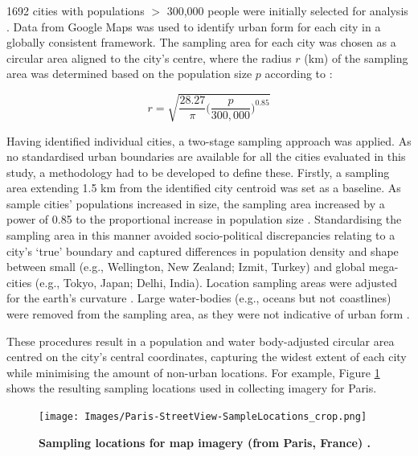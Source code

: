 \documentclass[final,3p,times,authoryear]{elsarticle}
\begin{document}
1692 cities with populations $>$ 300,000 people were initially selected for analysis \citep{UN2014}. Data from Google Maps was used to identify urban form for each city in a globally consistent framework. The sampling area for each city was chosen as a circular area aligned to the city's centre, where the radius $r$ (km) of the sampling area was determined based on the population size $p$ according to \citet{Barthelemy2016}: 

\begin{equation}
r = \sqrt{ \frac{28.27}{\pi} \bigg( \frac{p}{300,000}  \bigg)^{0.85} }
\end{equation}


Having identified individual cities, a two-stage sampling approach was applied. As no standardised urban boundaries are available for all the cities evaluated in this study, a methodology had to be developed to define these. Firstly, a sampling area extending 1.5 km from the identified city centroid \citep{UN2014} was set as a baseline. As sample cities' populations increased in size, the sampling area increased by a power of 0.85 to the proportional increase in population size \citep{Barthelemy2016}. Standardising the sampling area in this manner avoided socio-political discrepancies relating to a city's `true' boundary and captured differences in population density and shape between small (e.g., Wellington, New Zealand; Izmit, Turkey) and global mega-cities (e.g., Tokyo, Japan;  Delhi, India). Location sampling areas were adjusted for the earth's curvature \citep{Sinnott1984}. Large water-bodies (e.g., oceans but not coastlines) were removed from the sampling area, as they were not indicative of urban form . 

These procedures result in a population and water body-adjusted circular area centred on the city's central coordinates, capturing the widest extent of each city while minimising the amount of non-urban locations. For example, Figure \ref{fig:parissample} shows the resulting sampling locations used in collecting imagery for Paris. 

\begin{figure}[!htbp]
    \centering    
\texttt{[image: Images/Paris-StreetView-SampleLocations\_crop.png]}  
\caption{\bf Sampling locations for map imagery (from Paris, France) \citep{GoogleStatic2017}.}    
 \label{fig:parissample}  
\end{figure} 
\end{document}
